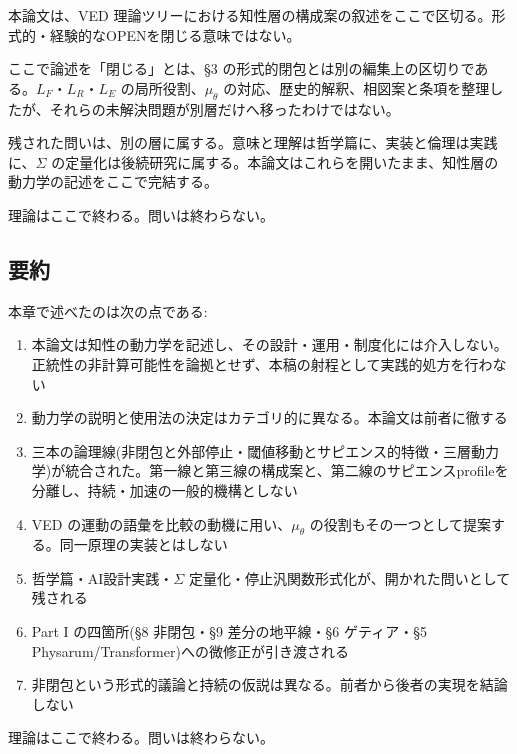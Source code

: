 本論文は、VED 理論ツリーにおける知性層の構成案の叙述をここで区切る。形式的・経験的なOPENを閉じる意味ではない。

ここで論述を「閉じる」とは、\S{}3 の形式的閉包とは別の編集上の区切りである。$L_F$・$L_R$・$L_E$ の局所役割、$\mu_\theta$ の対応、歴史的解釈、相図案と条項を整理したが、それらの未解決問題が別層だけへ移ったわけではない。

残された問いは、別の層に属する。意味と理解は哲学篇に、実装と倫理は実践に、$\Sigma$ の定量化は後続研究に属する。本論文はこれらを開いたまま、知性層の動力学の記述をここで完結する。

理論はここで終わる。問いは終わらない。

\bigskip


\subsection{要約}


本章で述べたのは次の点である:

\begin{enumerate}
\item 本論文は知性の動力学を記述し、その設計・運用・制度化には介入しない。正統性の非計算可能性を論拠とせず、本稿の射程として実践的処方を行わない
\item 動力学の説明と使用法の決定はカテゴリ的に異なる。本論文は前者に徹する
\item 三本の論理線(非閉包と外部停止・閾値移動とサピエンス的特徴・三層動力学)が統合された。第一線と第三線の構成案と、第二線のサピエンスprofileを分離し、持続・加速の一般的機構としない
\item VED の運動の語彙を比較の動機に用い、$\mu_\theta$ の役割もその一つとして提案する。同一原理の実装とはしない
\item 哲学篇・AI設計実践・$\Sigma$ 定量化・停止汎関数形式化が、開かれた問いとして残される
\item Part I の四箇所(\S{}8 非閉包・\S{}9 差分の地平線・\S{}6 ゲティア・\S{}5 Physarum/Transformer)への微修正が引き渡される
\item 非閉包という形式的議論と持続の仮説は異なる。前者から後者の実現を結論しない
\end{enumerate}


理論はここで終わる。問いは終わらない。

\bigskip

